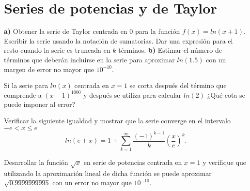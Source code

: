 \documentclass{article}
\begin{document}
\section{Series de potencias y de Taylor}

\begin{problem}{1}
\textbf{a)} Obtener la serie de Taylor centrada en $0$ para la función $f(x)=ln(x+1)$. Escribir la serie usando la notación de sumatorias. Dar una expresión para el resto cuando la serie es truncada en $k$ términos.
\newline \textbf{b)} Estimar el número de términos que deberán incluirse en la serie para aproximar $ln(1.5)$ con un margen de error no mayor que $10^{-10}$.
\end{problem}

\begin{problem}{2}
Si la serie para $ln(x)$ centrada en $x = 1$ se corta después del término que comprende a $(x-1)^{1000}$
y después se utiliza para calcular $ln(2)$ ¿Qué cota se puede imponer al error?
\end{problem}

\begin{problem}{3}
Verificar la siguiente igualdad y mostrar que la serie converge en el intervalo $-e<x\leq e$
\begin{equation*}
    ln(e+x) = 1 + \sum_{k=1}^{\infty} \frac{(-1)^{k-1}}{k} \left( \frac{x}{e} \right) ^k.
\end{equation*}
\end{problem}

\begin{problem}
Desarrollar la función $\sqrt{x}$ en serie de potencias centrada en $x=1$ y verifique que utilizando la aproximación lineal de dicha función se puede aproximar $\sqrt{0.9999999995}$ con un error no mayor que $10^{-10}$.
\end{problem}
\end{document}
